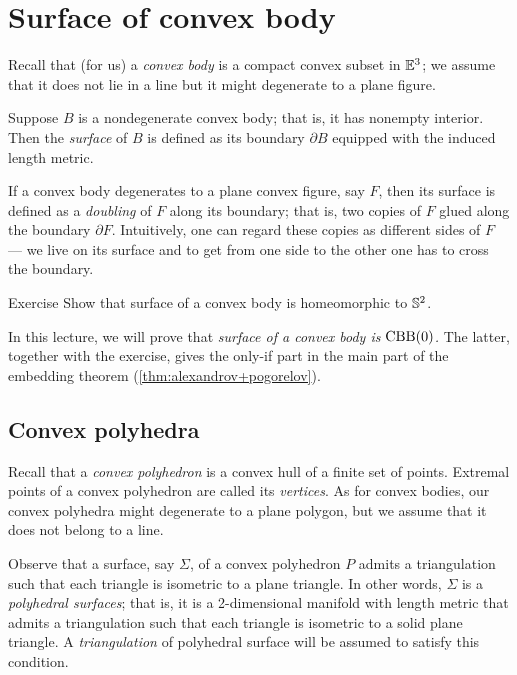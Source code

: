 \chapter{Surface of convex body}\label{chap:convex-body}

Recall that (for us) a \emph{convex body} is a compact convex subset in $\mathbb{E}^3$;
we assume that it does not lie in a line but it might degenerate to a plane figure.

Suppose $B$ is a nondegenerate convex body; that is, it has nonempty interior.
Then the \emph{surface} of $B$ is defined as its boundary $\partial B$ equipped with the induced length metric.

If a convex body degenerates to a plane convex figure, say $F$, then its surface is defined as a \emph{doubling} of $F$ along its boundary;
that is, two copies of $F$ glued along the boundary $\partial F$.
Intuitively, one can regard these copies as different sides of $F$ --- we live on its surface and to get from one side to the other one has to cross the boundary.

\begin{thm}{Exercise}\label{ex:surf-S2}
Show that surface of a convex body is homeomorphic to $\mathbb{S}^2$.
\end{thm}

In this lecture, we will prove that \textit{surface of a convex body is $\mathrm{CBB}(0)$.}
The latter, together with the exercise, gives the only-if part in the main part of the embedding theorem (\ref{thm:alexandrov+pogorelov}). 



\section{Convex polyhedra}

Recall that a \emph{convex polyhedron} is a convex hull of a finite set of points.
Extremal points of a convex polyhedron are called its \emph{vertices}.
As for convex bodies, our convex polyhedra might degenerate to a plane polygon, but we assume that it does not belong to a line.

Observe that a surface, say $\Sigma$, of a convex polyhedron $P$ admits a triangulation such that each triangle is isometric to a plane triangle.
In other words, $\Sigma$ is a \emph{polyhedral surfaces};
that is, it is a 2-dimensional manifold with length metric that admits a triangulation such that each triangle is isometric to a solid plane triangle.
A \emph{triangulation} of polyhedral surface will be assumed to satisfy this condition.

